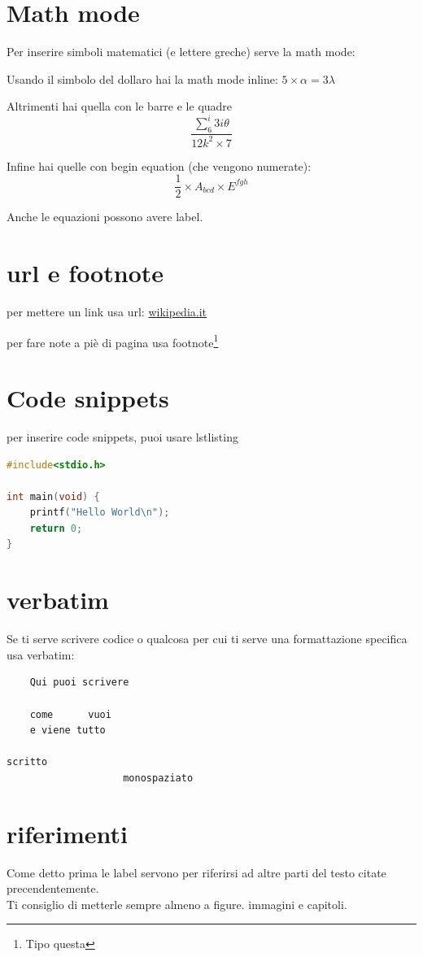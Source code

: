 \documentclass[12pt,a4paper,twoside]{book}
\begin{document}
\section{Math mode}
Per inserire simboli matematici (e lettere greche) serve la math mode:

Usando il simbolo del dollaro hai la math mode inline: $5 \times \alpha = 3\lambda$

Altrimenti hai quella con le barre e le quadre \[ \frac{\sum_6^i 3i\theta}{12k^2\times 7}\]

Infine hai quelle con begin equation (che vengono numerate):
\begin{equation}
    \frac{1}{2}\times A_{bcd}\times E^{fgh}
\end{equation}

Anche le equazioni possono avere label.
\section{url e footnote}
per mettere un link usa url: \url{wikipedia.it}

per fare note a piè di pagina usa footnote\footnote{Tipo questa}

\section{Code snippets}
per inserire code snippets, puoi usare lstlisting

\begin{lstlisting}[language=c]
#include<stdio.h>

int main(void) {
    printf("Hello World\n");
    return 0;
}
\end{lstlisting}

\section{verbatim}
Se ti serve scrivere codice o qualcosa per cui ti serve una formattazione specifica usa verbatim:
\begin{verbatim}
    Qui puoi scrivere

    come      vuoi
    e viene tutto

scritto
                    monospaziato
\end{verbatim}
\section{riferimenti}
Come detto prima le label servono per riferirsi ad altre parti del testo citate precendentemente.\\
Ti consiglio di metterle sempre almeno a figure. immagini e capitoli.
\end{document}
